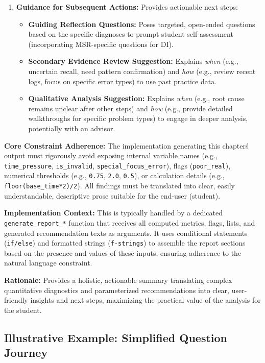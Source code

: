 \documentclass{article}
\begin{document}
\begin{enumerate}
    \item \textbf{Guidance for Subsequent Actions:} Provides actionable next steps:
    \begin{itemize}
        \item \textbf{Guiding Reflection Questions:} Poses targeted, open-ended questions based on the specific diagnoses to prompt student self-assessment (incorporating MSR-specific questions for DI).
        \item \textbf{Secondary Evidence Review Suggestion:} Explains \textit{when} (e.g., uncertain recall, need pattern confirmation) and \textit{how} (e.g., review recent logs, focus on specific error types) to use past practice data.
        \item \textbf{Qualitative Analysis Suggestion:} Explains \textit{when} (e.g., root cause remains unclear after other steps) and \textit{how} (e.g., provide detailed walkthroughs for specific problem types) to engage in deeper analysis, potentially with an advisor.
    \end{itemize}
\end{enumerate}

\textbf{Core Constraint Adherence:} The implementation generating this chapter\'s output must rigorously avoid exposing internal variable names (e.g., \texttt{time\_pressure}, \texttt{is\_invalid}, \texttt{special\_focus\_error}), flags (\texttt{poor\_real}), numerical thresholds (e.g., \texttt{0.75}, \texttt{2.0}, \texttt{0.5}), or calculation details (e.g., \texttt{floor(base\_time*2)/2}). All findings must be translated into clear, easily understandable, descriptive prose suitable for the end-user (student).

\textbf{Implementation Context:} This is typically handled by a dedicated \texttt{generate\_report\_*} function that receives all computed metrics, flags, lists, and generated recommendation texts as arguments. It uses conditional statements (\texttt{if/else}) and formatted strings (\texttt{f-strings}) to assemble the report sections based on the presence and values of these inputs, ensuring adherence to the natural language constraint.

\textbf{Rationale:} Provides a holistic, actionable summary translating complex quantitative diagnostics and parameterized recommendations into clear, user-friendly insights and next steps, maximizing the practical value of the analysis for the student.

\subsection{Illustrative Example: Simplified Question Journey}
\end{document}

